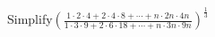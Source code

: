 Simplify$ \left(\frac {1 \cdot 2 \cdot 4 + 2 \cdot 4 \cdot 8 + \cdots + n \cdot 2n \cdot 4n}{1 \cdot 3 \cdot 9 + 2 \cdot 6 \cdot 18 + \cdots + n \cdot 3n \cdot 9n}\right)^{\frac {1}{3}}$